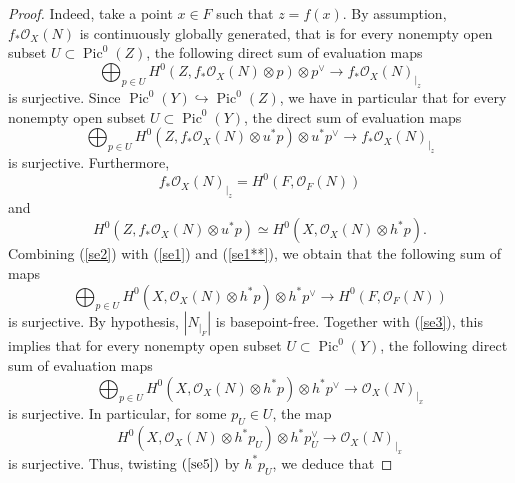 \documentclass[sn-mathphys-num]{sn-jnl}%
\theoremstyle{definition}
\numberwithin{equation}{section}
\begin{document}
\begin{proof} Indeed, take a point $x\in F$ such that $z =f(x)$. By assumption, $f_{*}\mathcal{O}_{X}(N)$ is continuously globally generated, that is
for every nonempty open subset $U \subset \operatorname{Pic}^{0}(Z)$, the following direct sum of evaluation maps 
\begin{equation}\label{se1*}
\bigoplus_{p \in U} H^{0}(Z, f_{*}\mathcal{O}_{X}(N)\otimes p) \otimes p^{\vee} \to f_{*}\mathcal{O}_{X}(N)_{|_{z}}
\end{equation}
is surjective. Since $\operatorname{Pic}^{0}(Y) \hookrightarrow \operatorname{Pic}^{0}(Z)$, we have in particular that for every nonempty open subset $U \subset \operatorname{Pic}^{0}(Y)$, the direct sum of evaluation maps
\begin{equation}\label{se1**}
\bigoplus_{p \in U} H^{0}(Z, f_{*}\mathcal{O}_{X}(N)\otimes u^{*}p) \otimes u^{*}p^{\vee} \to f_{*}\mathcal{O}_{X}(N)_{|_{z}}
\end{equation}
is surjective. Furthermore,  \begin{equation}\label{se1}
f_{*}\mathcal{O}_{X}(N)_{|_{z}} = H^{0}(F, \mathcal{O}_{F}(N)) 
\end{equation}
and 
\begin{equation}\label{se2}
H^{0}(Z, f_{*}\mathcal{O}_{X}(N)\otimes u^{*}p) \simeq H^{0}(X, \mathcal{O}_{X}(N) \otimes h^{*}p).
\end{equation}
Combining (\ref{se2}) with (\ref{se1}) and (\ref{se1**}), we obtain that the following sum of maps
\begin{equation}\label{se3}
\bigoplus_{p \in U} H^{0}(X, \mathcal{O}_{X}(N) \otimes h^{*}p) \otimes h^{*}p^{\vee} \to H^{0}(F, \mathcal{O}_{F}(N))
\end{equation}
is surjective. By hypothesis, $|N_{|_{F}}|$ is basepoint-free. Together with (\ref{se3}), this implies that for every nonempty open subset $U \subset \operatorname{Pic}^{0}(Y)$, the following direct sum of evaluation maps
\begin{equation}\label{se4}
\bigoplus_{p \in U} H^{0}(X, \mathcal{O}_{X}(N) \otimes h^{*}p) \otimes h^{*}p^{\vee} \to \mathcal{O}_{X}(N)_{|_{x}}    
\end{equation}
is surjective. In particular, for some $p_{U} \in U$, the map 
\begin{equation}\label{se5}
 H^{0}(X, \mathcal{O}_{X}(N) \otimes h^{*}p_{U}) \otimes h^{*}p_{U}^{\vee} \to \mathcal{O}_{X}(N)_{|_{x}}    
\end{equation}
is surjective. Thus, twisting $(\ref{se5})$ by $h^{*}p_{U}$, we deduce that 

\end{proof}
\end{document}
